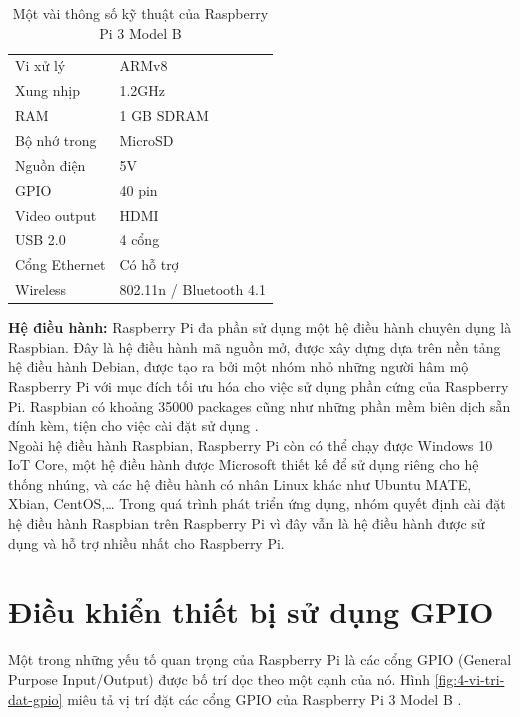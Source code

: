 \documentclass[12pt,a4paper,oneside]{extbook}
\begin{document}
\begin{table}
\centering
\caption{Một vài thông số kỹ thuật của Raspberry Pi 3 Model B}\label{tab:pi-3-model-b-specs}
\begin{tabular}{ |l|l| } 
 \hline
	Vi xử lý		&	ARMv8\\
	Xung nhịp		&	1.2GHz\\
	RAM				&	1 GB SDRAM\\
	Bộ nhớ trong	&	MicroSD\\
	Nguồn điện		&	5V\\
	GPIO			&	40 pin\\
	Video output	&	HDMI\\
	USB 2.0			&	4 cổng\\
	Cổng Ethernet	&	Có hỗ trợ\\
	Wireless		&	802.11n / Bluetooth 4.1\\
 \hline
\end{tabular}
\end{table}

\noindent
\textbf{Hệ điều hành:} Raspberry Pi đa phần sử dụng một hệ điều hành chuyên dụng là Raspbian. Đây là hệ điều hành mã nguồn mở, được xây dựng dựa trên nền tảng hệ điều hành Debian, được tạo ra bởi một nhóm nhỏ những người hâm mộ Raspberry Pi với mục đích tối ưu hóa cho việc sử dụng phần cứng của Raspberry Pi. Raspbian có khoảng 35000 packages cũng như những phần mềm biên dịch sẵn đính kèm, tiện cho việc cài đặt sử dụng \cite{pi-wiki}\cite{raspbian-front-page}.\\

\noindent
Ngoài hệ điều hành Raspbian, Raspberry Pi còn có thể chạy được Windows 10 IoT Core, một hệ điều hành được Microsoft thiết kế để sử dụng riêng cho hệ thống nhúng, và các hệ điều hành có nhân Linux khác như Ubuntu MATE, Xbian, CentOS,\dots\hspace{0mm} Trong quá trình phát triển ứng dụng, nhóm quyết định cài đặt hệ điều hành Raspbian trên Raspberry Pi vì đây vẫn là hệ điều hành được sử dụng và hỗ trợ nhiều nhất cho Raspberry Pi.

\section{Điều khiển thiết bị sử dụng GPIO}
Một trong những yếu tố quan trọng của Raspberry Pi là các cổng GPIO (General Purpose Input/Output) được bố trí dọc theo một cạnh của nó. Hình \ref{fig:4-vi-tri-dat-gpio} miêu tả vị trí đặt các cổng GPIO của Raspberry Pi 3 Model B \cite{raspberry-gpio}.
\end{document}
